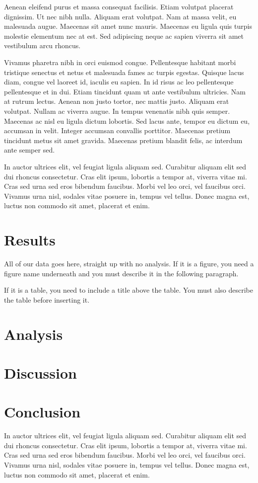 \documentclass[preprint,12pt]{elsarticle}
\begin{document}
Aenean eleifend purus et massa consequat facilisis. Etiam volutpat placerat dignissim. Ut nec nibh nulla. Aliquam erat volutpat. Nam at massa velit, eu malesuada augue. Maecenas sit amet nunc mauris. Maecenas eu ligula quis turpis molestie elementum nec at est. Sed adipiscing neque ac sapien viverra sit amet vestibulum arcu rhoncus.

Vivamus pharetra nibh in orci euismod congue. Pellentesque habitant morbi tristique senectus et netus et malesuada fames ac turpis egestas. Quisque lacus diam, congue vel laoreet id, iaculis eu sapien. In id risus ac leo pellentesque pellentesque et in dui. Etiam tincidunt quam ut ante vestibulum ultricies. Nam at rutrum lectus. Aenean non justo tortor, nec mattis justo. Aliquam erat volutpat. Nullam ac viverra augue. In tempus venenatis nibh quis semper. Maecenas ac nisl eu ligula dictum lobortis. Sed lacus ante, tempor eu dictum eu, accumsan in velit. Integer accumsan convallis porttitor. Maecenas pretium tincidunt metus sit amet gravida. Maecenas pretium blandit felis, ac interdum ante semper sed.

In auctor ultrices elit, vel feugiat ligula aliquam sed. Curabitur aliquam elit sed dui rhoncus consectetur. Cras elit ipsum, lobortis a tempor at, viverra vitae mi. Cras sed urna sed eros bibendum faucibus. Morbi vel leo orci, vel faucibus orci. Vivamus urna nisl, sodales vitae posuere in, tempus vel tellus. Donec magna est, luctus non commodo sit amet, placerat et enim.

\section{Results}
\label{Results}
All of our data goes here, straight up with no analysis.  If it is a figure, you need a figure name underneath and you must describe it in the following paragraph.  

If it is a table, you need to include a title above the table.  You must also describe the table before inserting it.  

\section{Analysis}
\label{Analysis}

\section{Discussion}
\label{Discussion}

\section{Conclusion}
\label{Conclusion}
In auctor ultrices elit, vel feugiat ligula aliquam sed. Curabitur aliquam elit sed dui rhoncus consectetur. Cras elit ipsum, lobortis a tempor at, viverra vitae mi. Cras sed urna sed eros bibendum faucibus. Morbi vel leo orci, vel faucibus orci. Vivamus urna nisl, sodales vitae posuere in, tempus vel tellus. Donec magna est, luctus non commodo sit amet, placerat et enim.
\end{document}

